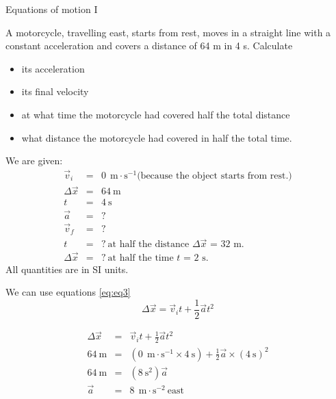       \noindent
\begin{wex}{Equations of motion I}{A motorcycle, travelling east, starts from rest, moves in a straight line with a constant acceleration and covers a distance of 64 m in 4 s. Calculate
\begin{itemize}
\item its acceleration
\item its final velocity
\item at what time the motorcycle had covered half the total distance
\item what distance the motorcycle had covered in half the total time.
\end{itemize}}
{
We are given:
\begin{eqnarray*}
\vec{v}_i&=&0\ ~\text{m}\cdot \text{s}^{-1} \mbox{(because the object starts from rest.)}\\
\Delta \vec{x}&=&64\ \text{m}\\
t&=&4\ \text{s}\\
\vec{a}&=&?\\
\vec{v}_f&=&?\\
t&=&?\ \mbox{at half the distance $\Delta \vec{x}$~=~32~m.}\\
\Delta \vec{x}&=&?\ \mbox{at half the time $t$~=~2~s.}
\end{eqnarray*}
All quantities are in SI units.

We can use equations \ref{eq:eq3}
\begin{displaymath}
\Delta \vec{x} = \vec{v}_it +\frac{1}{2}\vec{a}t^2
\end{displaymath}

\begin{eqnarray*}
\Delta \vec{x} &=& \vec{v}_it +\frac{1}{2}\vec{a}t^2\\
64\ \text{m} &=& (0\ ~\text{m}\cdot \text{s}^{-1} \times 4\ \text{s}) + \frac{1}{2} \vec{a} \times (4\ \text{s})^2\\
64\ \text{m} &=& (8\ \text{s}^2) \vec{a}\\
\vec{a} &=&8\ ~\text{m}\cdot \text{s}^{-2}~\text{east}
\end{eqnarray*}

}
\end{wex}
